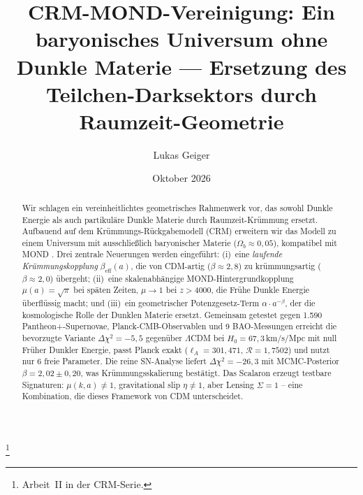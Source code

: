 \documentclass[aps,prd,twocolumn,superscriptaddress,nofootinbib,floatfix]{revtex4-2}
\begin{document}

\title{CRM-MOND-Vereinigung: Ein baryonisches Universum ohne Dunkle Materie \texorpdfstring{---}{--} Ersetzung des Teilchen-Darksektors durch Raumzeit-Geometrie}

\author{Lukas Geiger}

\date{Oktober 2026}

\begin{abstract}
Wir schlagen ein vereinheitlichtes geometrisches Rahmenwerk vor, das sowohl Dunkle Energie als auch partikuläre Dunkle Materie durch Raumzeit-Krümmung ersetzt. Aufbauend auf dem Krümmungs-Rückgabemodell (CRM) \cite{Geiger2026} erweitern wir das Modell zu einem Universum mit ausschließlich baryonischer Materie ($\Omega_b \approx 0{,}05$), kompatibel mit MOND \cite{Milgrom1983}. Drei zentrale Neuerungen werden eingeführt: (i)~eine \textit{laufende Krümmungskopplung} $\beta_{\mathrm{eff}}(a)$, die von CDM-artig ($\beta \approx 2{,}8$) zu krümmungsartig ($\beta \approx 2{,}0$) übergeht; (ii)~eine skalenabhängige MOND-Hintergrundkopplung $\mu(a) = \sqrt{\pi}$ bei späten Zeiten, $\mu \to 1$ bei $z > 4000$, die Frühe Dunkle Energie überflüssig macht; und (iii)~ein geometrischer Potenzgesetz-Term $\alpha \cdot a^{-\beta}$, der die kosmologische Rolle der Dunklen Materie ersetzt. Gemeinsam getestet gegen 1.590 Pantheon+-Supernovae, Planck-CMB-Observablen und 9 BAO-Messungen erreicht die bevorzugte Variante $\Delta\chi^2 = -5{,}5$ gegenüber $\Lambda$CDM bei $H_0 = 67{,}3$\,km/s/Mpc mit null Früher Dunkler Energie, passt Planck exakt ($\ell_A = 301{,}471$, $\mathcal{R} = 1{,}7502$) und nutzt nur 6 freie Parameter. Die reine SN-Analyse liefert $\Delta\chi^2 = -26{,}3$ mit MCMC-Posterior $\beta = 2{,}02 \pm 0{,}20$, was Krümmungsskalierung bestätigt. Das Scalaron erzeugt testbare Signaturen: $\mu(k,a) \neq 1$, gravitational slip $\eta \neq 1$, aber Lensing $\Sigma = 1$ -- eine Kombination, die dieses Framework von CDM unterscheidet.
\end{abstract}


\thanks{Arbeit~II in der CRM-Serie.}
\end{document}

